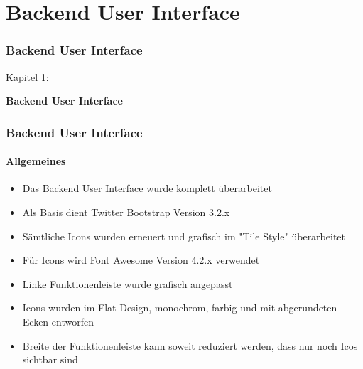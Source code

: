 %

\section{Backend User Interface}
\begin{frame}[fragile]
	\frametitle{Backend User Interface}

	\begin{center}\huge{Kapitel 1:}\end{center}
	\begin{center}\huge{\color{typo3darkgrey}\textbf{Backend User Interface}}\end{center}

\end{frame}


\begin{frame}[fragile]
	\frametitle{Backend User Interface}
	\framesubtitle{Allgemeines}

	\begin{itemize}
		\item Das Backend User Interface wurde komplett überarbeitet
		\item Als Basis dient Twitter Bootstrap Version 3.2.x
		\item Sämtliche Icons wurden erneuert und grafisch im "Tile Style" überarbeitet
		\item Für Icons wird Font Awesome Version 4.2.x verwendet
		\item Linke Funktionenleiste wurde grafisch angepasst
		\item Icons wurden im Flat-Design, monochrom, farbig und mit abgerundeten Ecken entworfen
		\item Breite der Funktionenleiste kann soweit reduziert werden, dass nur noch Icos sichtbar sind
	\end{itemize}

\end{frame}



